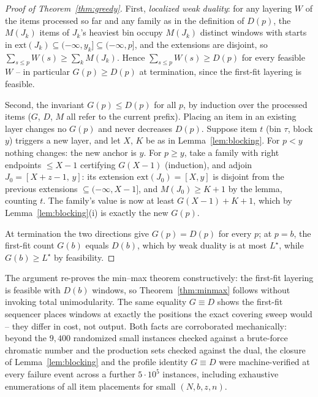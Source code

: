 \begin{proof}[Proof of Theorem~\ref{thm:greedy}]
First, \emph{localized weak duality}: for any layering $W$ of the items
processed so far and any family as in the definition of $D(p)$, the
$M(J_k)$ items of $J_k$'s heaviest bin occupy $M(J_k)$ distinct windows with
starts in $\mathrm{ext}(J_k) \subseteq (-\infty, y_k] \subseteq
(-\infty, p]$, and the extensions are disjoint, so
$\sum_{s \le p} W(s) \ge \sum_k M(J_k)$. Hence
$\sum_{s \le p} W(s) \ge D(p)$ for every feasible $W$ -- in particular
$G(p) \ge D(p)$ at termination, since the first-fit layering is feasible.

Second, the invariant $G(p) \le D(p)$ for all $p$, by induction over the
processed items ($G$, $D$, $M$ all refer to the current prefix). Placing an
item in an existing layer changes no $G(p)$ and never decreases $D(p)$.
Suppose item $t$ (bin $\tau$, block $y$) triggers a new layer, and let $X$,
$K$ be as in Lemma~\ref{lem:blocking}. For $p < y$ nothing changes: the new
anchor is $y$. For $p \ge y$, take a family with right endpoints
$\le X - 1$ certifying $G(X-1)$ (induction), and adjoin
$J_0 = [X + z - 1,\, y]$: its extension $\mathrm{ext}(J_0) = [X, y]$ is
disjoint from the previous extensions $\subseteq (-\infty, X - 1]$, and
$M(J_0) \ge K + 1$ by the lemma, counting $t$. The family's value is now at
least $G(X - 1) + K + 1$, which by Lemma~\ref{lem:blocking}(i) is exactly
the new $G(p)$.

At termination the two directions give $G(p) = D(p)$ for every $p$; at
$p = b$, the first-fit count $G(b)$ equals $D(b)$, which by weak duality is
at most $L^\star$, while $G(b) \ge L^\star$ by feasibility.
\end{proof}

\begin{remark}
The argument re-proves the min--max theorem constructively: the first-fit
layering is feasible with $D(b)$ windows, so
Theorem~\ref{thm:minmax} follows without invoking total unimodularity.
The same equality $G \equiv D$ shows the first-fit sequencer places windows
at exactly the positions the exact covering sweep would -- they differ in
cost, not output. Both facts are corroborated mechanically: beyond the
$9{,}400$ randomized small instances checked against a brute-force chromatic
number and the production sets checked against the dual, the closure of
Lemma~\ref{lem:blocking} and the profile identity $G \equiv D$ were
machine-verified at every failure event across a further $5 \cdot 10^5$
instances, including exhaustive enumerations of all item placements for
small $(N, b, z, n)$.
\end{remark}


